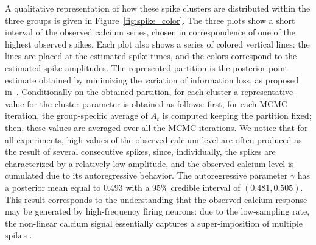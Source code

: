 

A qualitative representation of how these spike clusters are distributed within the three groups is given in Figure~\ref{fig:spike_color}. The three plots show a short interval of the observed calcium series, chosen in correspondence of one of the highest observed spikes. 
Each plot also shows a series of colored vertical lines: the lines are placed at the estimated spike times, and the colors correspond to the estimated spike amplitudes. 
The represented partition is the posterior point estimate obtained by minimizing the variation of information loss, as proposed in~\textcite{wade2018}. Conditionally on the obtained partition, for each cluster a representative value for the cluster parameter is obtained as follows: 
first, for each MCMC iteration, the group-specific average of $A_t$ is computed keeping the partition fixed; then, these values are averaged over all the MCMC iterations.
We notice that for all experiments, high values of the observed calcium level are often produced as the result of several consecutive spikes, since, individually, the spikes are characterized by a relatively low amplitude, and the observed calcium level is cumulated due to its autoregressive behavior.  The autoregressive parameter $\gamma$ has a posterior mean equal to $0.493$ with a 95\% credible interval of $(0.481, 0.505)$.
%
This result corresponds to the understanding that the observed calcium response may be generated by high-frequency firing neurons: due to the low-sampling rate, the non-linear calcium signal essentially captures a super-imposition of multiple spikes \parencite{Hoang2020}.  
